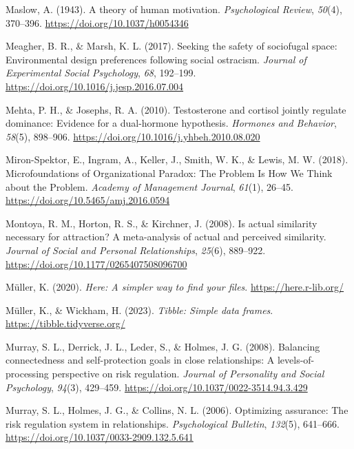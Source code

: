 \documentclass[
]{udthesis}
\newlength{\cslhangindent}
\newenvironment{CSLReferences}[2] %
 {\begin{list}{}{%
  \setlength{\itemindent}{0pt}
  \setlength{\leftmargin}{0pt}
  \setlength{\parsep}{0pt}
  \ifodd #1
   \setlength{\leftmargin}{\cslhangindent}
   \setlength{\itemindent}{-1\cslhangindent}
  \fi
  \setlength{\itemsep}{#2\baselineskip}}}
 {\end{list}}
\begin{document}
\begin{CSLReferences}{1}{0}
Maslow, A. (1943). A theory of human motivation. \emph{Psychological Review}, \emph{50}(4), 370--396. \url{https://doi.org/10.1037/h0054346}

Meagher, B. R., \& Marsh, K. L. (2017). Seeking the safety of sociofugal space: {Environmental} design preferences following social ostracism. \emph{Journal of Experimental Social Psychology}, \emph{68}, 192--199. \url{https://doi.org/10.1016/j.jesp.2016.07.004}

Mehta, P. H., \& Josephs, R. A. (2010). Testosterone and cortisol jointly regulate dominance: {Evidence} for a dual-hormone hypothesis. \emph{Hormones and Behavior}, \emph{58}(5), 898--906. \url{https://doi.org/10.1016/j.yhbeh.2010.08.020}

Miron-Spektor, E., Ingram, A., Keller, J., Smith, W. K., \& Lewis, M. W. (2018). Microfoundations of {Organizational Paradox}: {The Problem Is How We Think} about the {Problem}. \emph{Academy of Management Journal}, \emph{61}(1), 26--45. \url{https://doi.org/10.5465/amj.2016.0594}

Montoya, R. M., Horton, R. S., \& Kirchner, J. (2008). Is actual similarity necessary for attraction? A meta-analysis of actual and perceived similarity. \emph{Journal of Social and Personal Relationships}, \emph{25}(6), 889--922. \url{https://doi.org/10.1177/0265407508096700}

Müller, K. (2020). \emph{Here: A simpler way to find your files}. \url{https://here.r-lib.org/}

Müller, K., \& Wickham, H. (2023). \emph{Tibble: Simple data frames}. \url{https://tibble.tidyverse.org/}

Murray, S. L., Derrick, J. L., Leder, S., \& Holmes, J. G. (2008). Balancing connectedness and self-protection goals in close relationships: {A} levels-of-processing perspective on risk regulation. \emph{Journal of Personality and Social Psychology}, \emph{94}(3), 429--459. \url{https://doi.org/10.1037/0022-3514.94.3.429}

Murray, S. L., Holmes, J. G., \& Collins, N. L. (2006). Optimizing assurance: {The} risk regulation system in relationships. \emph{Psychological Bulletin}, \emph{132}(5), 641--666. \url{https://doi.org/10.1037/0033-2909.132.5.641}


\end{CSLReferences}
\end{document}
